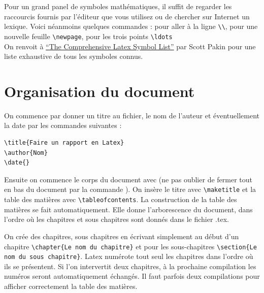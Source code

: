 Pour un grand panel de symboles mathématiques, il suffit de regarder les raccourcis fournis par l'éditeur 
que vous utilisez ou de chercher sur Internet un lexique. Voici néanmoins quelques commandes : 
pour aller à la ligne  \lstinline+\\+, 
pour une nouvelle feuille \lstinline+\newpage+, pour les trois points  \lstinline+\ldots+\medskip
\\
On renvoit à \href{http://www.tex.ac.uk/tex-archive/info/symbols/comprehensive/symbols-a4.pdf}
{``The Comprehensive Latex Symbol List''} par Scott Pakin pour une liste exhaustive de tous les
 symboles connus.


\section{Organisation du document}


On commence par donner un titre au  fichier, le nom de l'auteur et éventuellement la date par les
 commandes suivantes :\medskip

\begin{lstlisting}
\title{Faire un rapport en Latex} 
\author{Nom} 
\date{}
\end{lstlisting}



Ensuite on commence le corps du document avec \lstinline++ 
(ne pas oublier de fermer tout en bas du document par la commande \lstinline++). 
On insère le titre avec \lstinline+\maketitle+ et la table des matières avec \lstinline+\tableofcontents+.
La construction de la table des matières se fait automatiquement. 
Elle donne l'arborescence du document, dans l'ordre où les chapitres et sous chapitres sont donnés 
dans le fichier .tex.\medskip	


On crée  des chapitres, sous chapitres en écrivant simplement  au début d'un chapitre 
\lstinline+\chapter{Le nom du chapitre}+ 
et pour les sous-chapitres \lstinline+\section{Le nom du sous chapitre}+.  
Latex numérote tout seul les chapitres dans l'ordre où ils se présentent. 
Si l'on intervertit deux chapitres, à la prochaine compilation les numéros seront automatiquement 
échangés. Il faut parfois deux compilations pour afficher correctement la table des matières.  \medskip
 
